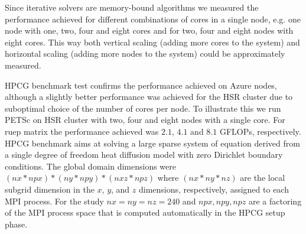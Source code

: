 \documentclass[3p,times]{elsarticle}
\begin{document}
Since iterative solvers are memory-bound algorithms we measured the performance achieved for different combinations of cores in a single node, e.g. one node with one, two, four and eight cores and for two, four and eight nodes with eight cores. This way both vertical scaling (adding more cores to the system) and horizontal scaling (adding more nodes to the system) could be approximately measured. %

HPCG benchmark test confirms the performance achieved on Azure nodes, although a slightly better performance was achieved for the HSR cluster due to suboptimal choice of the number of cores per node.  To illustrate this we run PETSc on HSR cluster with two, four and eight nodes with a single core. For ruep matrix the performance achieved was $2.1$, $4.1$ and $8.1$ GFLOPs, respectively. HPCG benchmark aims at solving a large sparse system of equation derived from a single degree of freedom heat diffusion model with zero Dirichlet boundary conditions. The global domain dimensions were $(nx * npx ) * (ny * npy ) * (nxz * npz )$ where $(nx * ny * nz )$ are the local subgrid dimension in the $x$, $y$, and $z$ dimensions, respectively, assigned to each MPI process. For the study $nx = ny = nz = 240$ and $npx, npy, npz$ are a factoring of the MPI process space that is computed automatically in the HPCG setup phase.
\end{document}
